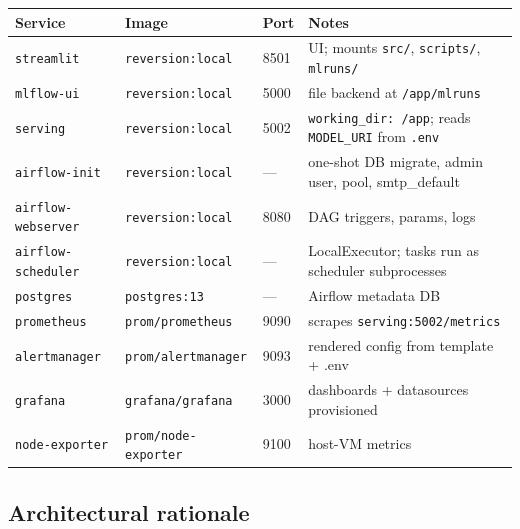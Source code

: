 \documentclass[11pt,a4paper]{article}
\begin{document}
\begin{tabularx}{\linewidth}{@{}lllX@{}}
\toprule
\textbf{Service} & \textbf{Image} & \textbf{Port} & \textbf{Notes} \\
\midrule
\texttt{streamlit}            & \texttt{reversion:local}     & 8501       & UI; mounts \texttt{src/}, \texttt{scripts/}, \texttt{mlruns/} \\
\texttt{mlflow-ui}            & \texttt{reversion:local}     & 5000       & file backend at \texttt{/app/mlruns} \\
\texttt{serving}              & \texttt{reversion:local}     & 5002       & \texttt{working\_dir: /app}; reads \texttt{MODEL\_URI} from \texttt{.env} \\
\texttt{airflow-init}         & \texttt{reversion:local}     & ---        & one-shot DB migrate, admin user, pool, smtp\_default \\
\texttt{airflow-webserver}    & \texttt{reversion:local}     & 8080       & DAG triggers, params, logs \\
\texttt{airflow-scheduler}    & \texttt{reversion:local}     & ---        & LocalExecutor; tasks run as scheduler subprocesses \\
\texttt{postgres}             & \texttt{postgres:13}         & ---        & Airflow metadata DB \\
\texttt{prometheus}           & \texttt{prom/prometheus}     & 9090       & scrapes \texttt{serving:5002/metrics} \\
\texttt{alertmanager}         & \texttt{prom/alertmanager}   & 9093       & rendered config from template + .env \\
\texttt{grafana}              & \texttt{grafana/grafana}     & 3000       & dashboards + datasources provisioned \\
\texttt{node-exporter}        & \texttt{prom/node-exporter}  & 9100       & host-VM metrics \\
\bottomrule
\end{tabularx}

\subsection{Architectural rationale}
\end{document}
